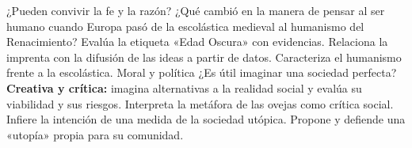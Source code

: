 \documentclass[malla]{planeacion}
\begin{document}
\begin{malla}{¿Pueden convivir la fe y la razón? ¿Qué cambió en la manera de pensar al ser humano
  cuando Europa pasó de la escolástica medieval al humanismo del Renacimiento?}
    {\punto Evalúa la etiqueta «Edad Oscura» con evidencias.
     \punto Relaciona la imprenta con la difusión de las ideas a partir de datos.
     \punto Caracteriza el humanismo frente a la escolástica.}
    {Moral y política}
    {¿Es útil imaginar una sociedad perfecta?}
    {\textbf{Creativa y crítica:} imagina alternativas a la realidad social y evalúa su
     viabilidad y sus riesgos.}
    {\punto Interpreta la metáfora de las ovejas como crítica social.
     \punto Infiere la intención de una medida de la sociedad utópica.
     \punto Propone y defiende una «utopía» propia para su comunidad.}
\end{malla}
\end{document}
